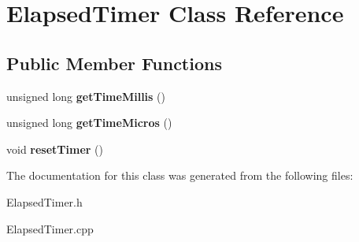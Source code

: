 \hypertarget{class_elapsed_timer}{}\section{Elapsed\+Timer Class Reference}
\label{class_elapsed_timer}
\subsection*{Public Member Functions}
\begin{DoxyCompactItemize}
\item 
\hypertarget{class_elapsed_timer_aa6ed4e7566d83605864f040dee3eeeb9}{}unsigned long {\bfseries get\+Time\+Millis} ()\label{class_elapsed_timer_aa6ed4e7566d83605864f040dee3eeeb9}

\item 
\hypertarget{class_elapsed_timer_a0f00d2036ff328c53d0f909272dc208f}{}unsigned long {\bfseries get\+Time\+Micros} ()\label{class_elapsed_timer_a0f00d2036ff328c53d0f909272dc208f}

\item 
\hypertarget{class_elapsed_timer_aa8f75bd5404d5b9646cf311f3fddea86}{}void {\bfseries reset\+Timer} ()\label{class_elapsed_timer_aa8f75bd5404d5b9646cf311f3fddea86}

\end{DoxyCompactItemize}


The documentation for this class was generated from the following files\+:\begin{DoxyCompactItemize}
\item 
Elapsed\+Timer.\+h\item 
Elapsed\+Timer.\+cpp\end{DoxyCompactItemize}
